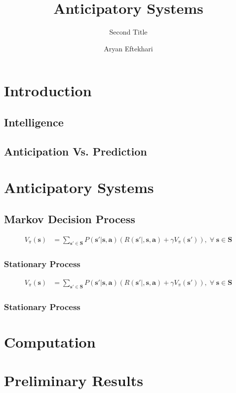 \documentclass[]{usiinfdocprop}
\author{Aryan Eftekhari}
\title{Anticipatory Systems}
\subtitle{Second Title}
\newcommand{\bb}[1]{\boldsymbol{\mathbf{#1}}}
\begin{document}
\maketitle
\frontmatter
\tableofcontents
\mainmatter



\chapter{Introduction}
\lipsum[2-5]


\section{Intelligence}

\lipsum[2-5]


\section{Anticipation Vs. Prediction}

\lipsum[2-5]



\chapter{Anticipatory Systems}

\section{Markov Decision Process}

\begin{align}
    V_\pi(\bb{s}) &= \sum_{\bb{s}' \in \bb{S}} P(\bb{s}'|\bb{s},\bb{a}) \left( R(\bb{s}'|,\bb{s},\bb{a}) + \gamma V_\pi(\bb{s}') \right), \; \forall \; \bb{s} \in \bb{S}      
\end{align}

\subsection{Stationary Process}

\begin{align}
    V_\pi(\bb{s}) &= \sum_{\bb{s}' \in \bb{S}} P(\bb{s}'|\bb{s},\bb{a}) \left( R(\bb{s}'|,\bb{s},\bb{a}) + \gamma V_\pi(\bb{s}') \right), \; \forall \; \bb{s} \in \bb{S}      
\end{align}

\subsection{Stationary Process}


\chapter{Computation}



\chapter{Preliminary Results}





\backmatter


\end{document}
